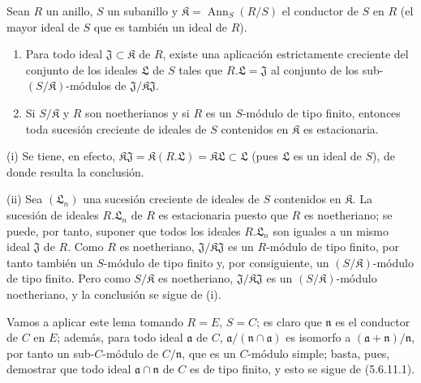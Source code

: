 \begin{lemma}[5.6.11.1]
Sean $R$ un anillo, $S$ un subanillo y
$\mathfrak K=\operatorname{Ann}_S(R/S)$ el conductor de $S$ en $R$
(el mayor ideal de $S$ que es también un ideal de $R$).
\begin{enumerate}
\item[\textup{(i)}] Para todo ideal $\mathfrak J\subset\mathfrak K$ de $R$, existe una
aplicación estrictamente creciente del conjunto de los ideales $\mathfrak L$
de $S$ tales que $R.\mathfrak L=\mathfrak J$ al conjunto de los
sub-$(S/\mathfrak K)$-módulos de
$\mathfrak J/\mathfrak K\mathfrak J$.
\item[\textup{(ii)}] Si $S/\mathfrak K$ y $R$ son noetherianos y si $R$ es un
$S$-módulo de tipo finito, entonces toda sucesión creciente de ideales de $S$
contenidos en $\mathfrak K$ es estacionaria.
\end{enumerate}
\end{lemma}

(i) Se tiene, en efecto,
$\mathfrak K\mathfrak J=\mathfrak K(R.\mathfrak L)
=\mathfrak K\mathfrak L\subset\mathfrak L$
(pues $\mathfrak L$ es un ideal de $S$), de donde resulta la conclusión.

(ii) Sea $(\mathfrak L_n)$ una sucesión creciente de ideales de $S$ contenidos
en $\mathfrak K$. La sucesión de ideales $R.\mathfrak L_n$ de $R$ es
estacionaria puesto que $R$ es noetheriano; se puede, por tanto, suponer que
todos los ideales $R.\mathfrak L_n$ son iguales a un mismo ideal $\mathfrak J$
de $R$. Como $R$ es noetheriano, $\mathfrak J/\mathfrak K\mathfrak J$ es un
$R$-módulo de tipo finito, por tanto también un $S$-módulo de tipo finito y,
por consiguiente, un $(S/\mathfrak K)$-módulo de tipo finito. Pero como
$S/\mathfrak K$ es noetheriano, $\mathfrak J/\mathfrak K\mathfrak J$ es un
$(S/\mathfrak K)$-módulo noetheriano, y la conclusión se sigue de (i).

Vamos a aplicar este lema tomando $R=E$, $S=C$; es claro que $\mathfrak n$ es
el conductor de $C$ en $E$; además, para todo ideal $\mathfrak a$ de $C$,
$\mathfrak a/(\mathfrak n\cap\mathfrak a)$ es isomorfo a
$(\mathfrak a+\mathfrak n)/\mathfrak n$, por tanto un sub-$C$-módulo de
$C/\mathfrak n$, que es un $C$-módulo simple; basta, pues, demostrar que todo
ideal $\mathfrak a\cap\mathfrak n$ de $C$ es de tipo finito, y esto se sigue
de (5.6.11.1).

